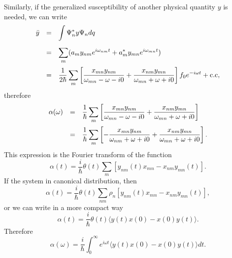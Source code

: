 \documentclass{book}
\newcommand{\average}[1]{\langle#1\rangle}
\numberwithin{equation}{section}
\begin{document}
Similarly, if the generalized susceptibility of another physical
quantity $y$ is needed, we can write
\begin{equation}
  \begin{array}{rcl}
    \bar{y}&=&\displaystyle\int \Psi_n^*y\Psi_ndq\\\vbox to 20pt{}
    &=&\displaystyle \sum_m(a_my_{nm}e^{i\omega_{nm}t}+
    a^*_{m}y_{mn}e^{i\omega_{mn}t})\\\vbox to 20pt{}
    &=&\displaystyle\frac{1}{2\hbar}\sum_m\left[
      \frac{x_{mn}y_{nm}}{\omega_{mn}-\omega-i0}+
      \frac{x_{nm}y_{mn}}{\omega_{mn}+\omega+i0}
      \right]f_0e^{-i\omega t}+\hbox{c.c},
  \end{array}
\end{equation}
therefore
\begin{equation}
  \begin{array}{rcl}
    \alpha(\omega)&=&\displaystyle\frac{1}{\hbar}\sum_m\left[
      \frac{x_{mn}y_{nm}}{\omega_{mn}-\omega-i0}+
      \frac{x_{nm}y_{mn}}{\omega_{mn}+\omega+i0}
      \right]\\\vbox to 20pt{}
    &=&\displaystyle\frac{1}{\hbar}\sum_m\left[
      -\frac{x_{mn}y_{nm}}{\omega_{nm}+\omega+i0}+
      \frac{x_{nm}y_{mn}}{\omega_{mn}+\omega+i0}
      \right].
  \end{array}
\end{equation}
This expression is the Fourier transform of the function
\begin{equation}
  \alpha(t)=\frac{i}{\hbar}\theta(t)\sum_m[y_{nm}(t)x_{mn}-x_{nm}y_{mn}(t)].
\end{equation}
If the system in canonical distribution, then 
\begin{equation}
  \alpha(t)=\frac{i}{\hbar}\theta(t)\sum_{nm}\rho_n[y_{nm}(t)x_{mn}-x_{nm}y_{mn}(t)],
\end{equation}
or we can write in a more compact way
\begin{equation}
  \alpha(t)=\frac{i}{\hbar}\theta(t)\average{y(t)x(0)-x(0)y(t)}.
\end{equation}
Therefore
\begin{equation}
  \alpha(\omega)=\frac{i}{\hbar}\int_0^\infty e^{i\omega
    t}\average{y(t)x(0)-x(0)y(t)}dt.
\end{equation}
\end{document}
